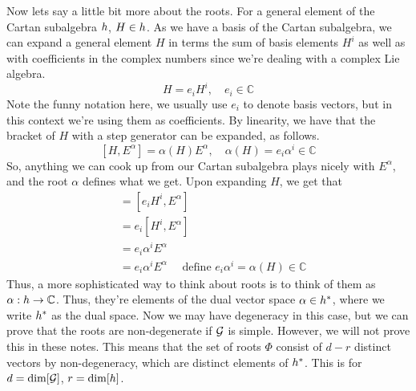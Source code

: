  Now lets say a little bit more about the roots. 
 For a general element of the Cartan subalgebra $ h $, 
 $ H \in h$. As we have a basis of the Cartan subalgebra, 
 we can expand a general element $ H $ in terms the sum of basis 
 elements $ H ^ i $ as well as with coefficients 
 in the complex numbers since we're dealing with a complex Lie algebra. 
 \[
  H = e_ i H ^ i , \quad e _ i \in \mathbb{ C} 
 \] Note the funny notation here, 
 we usually use $ e _ i $ to denote basis vectors, 
 but in this context we're using them 
 as coefficients. By linearity, we have that the bracket of $ H $ with a step generator 
 can be expanded, as follows. 
 \[
	 [ H , E ^ \alpha ] = \alpha ( H ) E ^{\alpha } , \quad \alpha ( H ) = e_ i \alpha ^ i \in 
	 \mathbb{ C} 
 \] So, anything we can cook up from 
 our Cartan subalgebra plays nicely with $E ^{ \alpha }$, 
 and the root $ \alpha $ defines what we get. 
 Upon expanding $ H $, we get that 
 \begin{align*}
	 [ H , E ^ \alpha ] &=   [ e_ i H ^ i, E ^ \alpha ]  \\
			    &= e_ i [ H ^ i , E ^ \alpha ]  \\
			    &=  e_i \alpha ^ i E ^ \alpha  \\
			    &=  e _ i \alpha ^ i E^ \alpha  \quad 
			    \text{ define } e_ i \alpha ^ i  = \alpha ( H ) \in \mathbb{ C}  
 \end{align*}Thus, a more sophisticated way to think about roots
 is to think of them as $ \alpha : h \to \mathbb{ C}  $. 
 Thus, they're elements of the dual vector space 
 $ \alpha \in h ^ * $, where we write $ h ^ * $ as 
  the dual space. Now we may have degeneracy in this case,
  but we can prove that the roots are non-degenerate if 
  $ \mathcal{ G } $ is simple. However, we will not prove this in these
  notes. 
  This means that the set of roots $ \Phi$ consist of  $ d - r $ 
  distinct vectors by non-degeneracy, which are distinct elements 
  of $ h ^ * $. This is for $ d  = \dim [ \mathcal{ G } ] $, $ r = \dim [ h ] $. 

